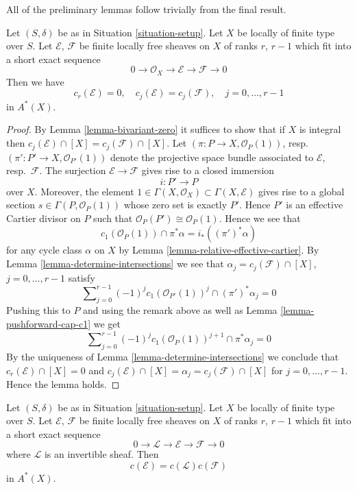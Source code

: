 \noindent
All of the preliminary lemmas follow trivially from the
final result.

\begin{lemma}
\label{lemma-get-rid-of-trivial-subbundle}
Let $(S, \delta)$ be as in Situation \ref{situation-setup}.
Let $X$ be locally of finite type over $S$.
Let $\mathcal{E}$, $\mathcal{F}$ be finite locally free sheaves
on $X$ of ranks $r$, $r - 1$ which fit into a short
exact sequence
$$
0 \to \mathcal{O}_X \to \mathcal{E} \to \mathcal{F} \to 0
$$
Then we have
$$
c_r(\mathcal{E}) = 0, \quad
c_j(\mathcal{E}) = c_j(\mathcal{F}), \quad j = 0, \ldots, r - 1
$$
in $A^*(X)$.
\end{lemma}

\begin{proof}
By Lemma \ref{lemma-bivariant-zero}
it suffices to show that if $X$ is integral
then $c_j(\mathcal{E}) \cap [X] = c_j(\mathcal{F}) \cap [X]$.
Let $(\pi : P \to X, \mathcal{O}_P(1))$,
resp.\ $(\pi' : P' \to X, \mathcal{O}_{P'}(1))$ denote the
projective space bundle associated to $\mathcal{E}$, resp.\ $\mathcal{F}$.
The surjection $\mathcal{E} \to \mathcal{F}$ gives rise
to a closed immersion
$$
i : P' \longrightarrow P
$$
over $X$. Moreover, the element
$1 \in \Gamma(X, \mathcal{O}_X) \subset \Gamma(X, \mathcal{E})$
gives rise to a global section $s \in \Gamma(P, \mathcal{O}_P(1))$
whose zero set is exactly $P'$. Hence $P'$ is an effective Cartier
divisor on $P$ such that $\mathcal{O}_P(P') \cong \mathcal{O}_P(1)$.
Hence we see that
$$
c_1(\mathcal{O}_P(1)) \cap \pi^*\alpha = i_*((\pi')^*\alpha)
$$
for any cycle class $\alpha$ on $X$ by
Lemma \ref{lemma-relative-effective-cartier}.
By Lemma \ref{lemma-determine-intersections} we see that
$\alpha_j = c_j(\mathcal{F}) \cap [X]$, $j = 0, \ldots, r - 1$
satisfy
$$
\sum\nolimits_{j = 0}^{r - 1} (-1)^jc_1(\mathcal{O}_{P'}(1))^j
\cap (\pi')^*\alpha_j = 0
$$
Pushing this to $P$ and using the remark above as well as
Lemma \ref{lemma-pushforward-cap-c1} we get
$$
\sum\nolimits_{j = 0}^{r - 1}
(-1)^j c_1(\mathcal{O}_P(1))^{j + 1}
\cap \pi^*\alpha_j = 0
$$
By the uniqueness of Lemma \ref{lemma-determine-intersections}
we conclude that
$c_r(\mathcal{E}) \cap [X] = 0$ and
$c_j(\mathcal{E}) \cap [X] = \alpha_j = c_j(\mathcal{F}) \cap [X]$
for $j = 0, \ldots, r - 1$. Hence the lemma holds.
\end{proof}

\begin{lemma}
\label{lemma-additivity-invertible-subsheaf}
Let $(S, \delta)$ be as in Situation \ref{situation-setup}.
Let $X$ be locally of finite type over $S$.
Let $\mathcal{E}$, $\mathcal{F}$ be finite locally free sheaves
on $X$ of ranks $r$, $r - 1$ which fit into a short
exact sequence
$$
0 \to \mathcal{L} \to \mathcal{E} \to \mathcal{F} \to 0
$$
where $\mathcal{L}$ is an invertible sheaf.
Then
$$
c(\mathcal{E}) = c(\mathcal{L}) c(\mathcal{F})
$$
in $A^*(X)$.
\end{lemma}

